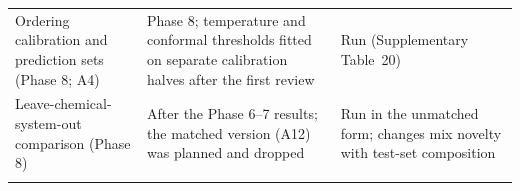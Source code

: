 \documentclass[pdflatex,sn-nature]{sn-jnl}
\begin{document}
\begin{table}[!ht]
\begin{tabular}{@{}>{\raggedright\arraybackslash}p{88pt}>{\raggedright\arraybackslash}p{150pt}>{\raggedright\arraybackslash}p{116pt}@{}}
Ordering calibration and prediction sets (Phase 8; A4) & Phase 8; temperature and conformal thresholds fitted on separate calibration halves after the first review & Run (Supplementary Table~20) \\
Leave-chemical-system-out comparison (Phase 8) & After the Phase 6--7 results; the matched version (A12) was planned and dropped & Run in the unmatched form; changes mix novelty with test-set composition \\
\botrule
\end{tabular}
\end{table}
\end{document}
